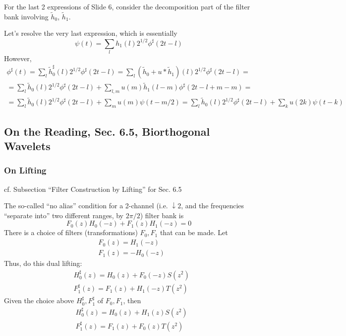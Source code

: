 \documentclass[twoside]{amsart}
\theoremstyle{plain}
\theoremstyle{definition}
\theoremstyle{remark}
\numberwithin{equation}{section}
\begin{document}
For the last 2 expressions of Slide 6, consider the decomposition part of the filter bank involving $\widetilde{h}_0$, $\widetilde{h}_1$.  

Let's resolve the very last expression, which is essentially
\[
\psi(t) = \sum_l h_1(l)2^{1/2} \phi^{\sharp}(2t-l)
\]
However, 
\[
\begin{gathered}
  \phi^{\sharp}(t) = \sum_l \widetilde{h}^{\sharp}_0(l) 2^{1/2} \phi^{\sharp}(2t-l) = \sum_l (\widetilde{h}_0 + u *\widetilde{h}_1  )(l) 2^{1/2}\phi^{\sharp}(2t-l) = \\
  = \sum_l \widetilde{h}_0(l) 2^{1/2} \phi^{\sharp}(2t-l) + \sum_{l,m} u(m)\widetilde{h}_1(l-m) \phi^{\sharp}(2t-l +m - m) =  \\
  = \sum_l \widetilde{h}_0(l) 2^{1/2} \phi^{\sharp}(2t-l) + \sum_m u(m) \psi(t-m/2) = \sum_l \widetilde{h}_0(l) 2^{1/2} \phi^{\sharp}(2t-l) + \sum_k u(2k) \psi(t-k)
\end{gathered}
\]


\subsection{On the Reading, Sec. 6.5, Biorthogonal Wavelets}

\subsubsection{On Lifting}

cf. Subsection ``Filter Construction by Lifting'' for Sec. 6.5 \cite{GStrangTNguyen1996}

The so-called ``no alias'' condition for a 2-channel (i.e. $\downarrow 2$, and the frequencies ``separate into'' two different ranges, by $2\pi/2$) filter bank is 
\[
F_0(z) H_0(-z) + F_1(z) H_1(-z) = 0 
\]
There is a choice of filters (transformations) $F_0,F_1$ that can be made.  Let 
\[
\begin{aligned}
  & F_0(z) = H_1(-z) \\ 
  & F_1(z) = -H_0(-z)
\end{aligned}
\]
Thus, do this dual lifting:
\[
\begin{aligned}
  & H_0^{\sharp}(z) = H_0(z) + F_0(-z)S(z^2) \\ 
  & F_1^{\sharp}(z) = F_1(z)+H_1(-z)T(z^2)
\end{aligned}
\]
Given the choice above $H_0^{\sharp},F_1^{\sharp}$ of $F_0, F_1$, then 
\[
\begin{aligned}
  & H_0^{\sharp}(z) = H_0(z) + H_1(z)S(z^2) \\ 
  & F_1^{\sharp}(z) = F_1(z)+ F_0(z)T(z^2)
\end{aligned}
\]
\end{document}
